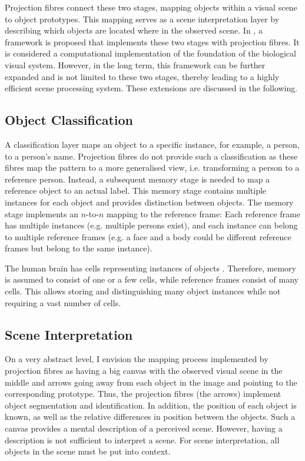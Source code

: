 Projection fibres connect these two stages, mapping objects within a visual scene to object prototypes.
This mapping serves as a scene interpretation layer by describing which objects are located where in the observed scene.
In , a framework is proposed that implements these two stages with projection fibres.
It is considered a computational implementation of the foundation of the biological visual system.
However, in the long term, this framework can be further expanded and is not limited to these two stages, thereby leading to a highly efficient scene processing system.
These extensions are discussed in the following.

\subsection{Object Classification}
A classification layer maps an object to a specific instance, for example, a person, to a person's name. Projection fibres do not provide such a classification as these fibres map the pattern to a more generalised view, i.e. transforming a person to a reference person. Instead, a subsequent memory stage is needed to map a reference object to an actual label.
This memory stage contains multiple instances for each object and provides distinction between objects. The memory stage implements an $n$-to-$n$ mapping to the reference frame: Each reference frame has multiple instances (e.g. multiple persons exist), and each instance can belong to multiple reference frames (e.g. a face and a body could be different reference frames but belong to the same instance).

The human brain has cells representing instances of objects .
Therefore, memory is assumed to consist of one or a few cells, while reference frames consist of many cells.
This allows storing and distinguishing many object instances while not requiring a vast number of cells.


\subsection{Scene Interpretation}
On a very abstract level, I envision the mapping process implemented by projection fibres as having a big canvas with the observed visual scene in the middle and arrows going away from each object in the image and pointing to the corresponding prototype. Thus, the projection fibres (the arrows) implement object segmentation and identification.
In addition, the position of each object is known, as well as the relative differences in position between the objects.
Such a canvas provides a mental description of a perceived scene. However, having a description is not sufficient to interpret a scene. For scene interpretation, all objects in the scene must be put into context.


